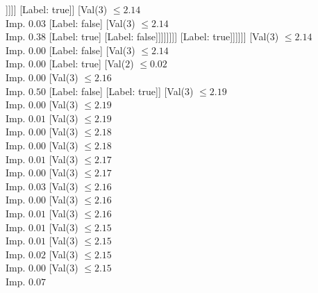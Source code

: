 \documentclass[margin=10pt]{standalone}
\begin{document}
\begin{forest}
																									[Label: true]
																									[Val($3$) $ \leq 2.14$ \\ Imp. $0.03$
																										[Label: false]
																										[Val($3$) $ \leq 2.14$ \\ Imp. $0.38$
																											[Label: true]
																											[Label: false]]]]]
																							[Label: true]]
																						[Val($3$) $ \leq 2.14$ \\ Imp. $0.03$
																							[Label: false]
																							[Val($3$) $ \leq 2.14$ \\ Imp. $0.38$
																								[Label: true]
																								[Label: false]]]]]]]]
																	[Label: true]]]]]]
												[Val($3$) $ \leq 2.14$ \\ Imp. $0.00$
													[Label: false]
													[Val($3$) $ \leq 2.14$ \\ Imp. $0.00$
														[Label: true]
														[Val($2$) $ \leq 0.02$ \\ Imp. $0.00$
															[Val($3$) $ \leq 2.16$ \\ Imp. $0.50$
																[Label: false]
																[Label: true]]
															[Val($3$) $ \leq 2.19$ \\ Imp. $0.00$
																[Val($3$) $ \leq 2.19$ \\ Imp. $0.01$
																	[Val($3$) $ \leq 2.19$ \\ Imp. $0.00$
																		[Val($3$) $ \leq 2.18$ \\ Imp. $0.00$
																			[Val($3$) $ \leq 2.18$ \\ Imp. $0.01$
																				[Val($3$) $ \leq 2.17$ \\ Imp. $0.00$
																					[Val($3$) $ \leq 2.17$ \\ Imp. $0.03$
																						[Val($3$) $ \leq 2.16$ \\ Imp. $0.00$
																							[Val($3$) $ \leq 2.16$ \\ Imp. $0.01$
																								[Val($3$) $ \leq 2.16$ \\ Imp. $0.01$
																									[Val($3$) $ \leq 2.15$ \\ Imp. $0.01$
																										[Val($3$) $ \leq 2.15$ \\ Imp. $0.02$
																											[Val($3$) $ \leq 2.15$ \\ Imp. $0.00$
																												[Val($3$) $ \leq 2.15$ \\ Imp. $0.07$

\end{forest}
\end{document}
